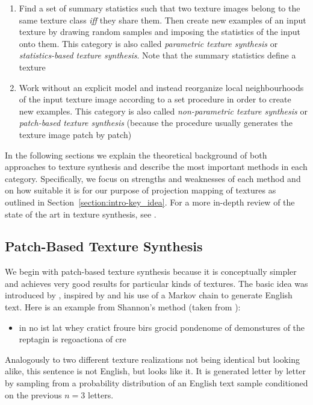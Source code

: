 \begin{enumerate}
    \item Find a set of summary statistics such that two texture images belong to the same texture class \textit{iff} they share them. Then create new examples of an input texture by drawing random samples and imposing the statistics of the input onto them. This category is also called \textit{parametric texture synthesis} or \textit{statistics-based texture synthesis}. Note that the summary statistics define a texture
    \item Work without an explicit model and instead reorganize local neighbourhoods of the input texture image according to a set procedure in order to create new examples. This category is also called \textit{non-parametric texture synthesis} or \textit{patch-based texture synthesis} (because the procedure usually generates the texture image patch by patch)
\end{enumerate}

In the following sections we explain the theoretical background of both approaches to texture synthesis and describe the most important methods in each category. Specifically, we focus on strengths and weaknesses of each method and on how suitable it is for our purpose of projection mapping of textures as outlined in Section~\ref{section:intro-key_idea}. For a more in-depth review of the state of the art in texture synthesis, see \citet{Raad2018}.

\subsection{Patch-Based Texture Synthesis}
\label{section:background-texture_synthesis-patch_based}

We begin with patch-based texture synthesis because it is conceptually simpler and achieves very good results for particular kinds of textures. The basic idea was introduced by \citet{Efros1999}, inspired by \citet{Shannon1948} and his use of a Markov chain to generate English text. Here is an example from Shannon's method (taken from \citet{Raad2018}):

\begin{itemize}
    \item in no ist lat whey cratict froure birs grocid pondenome of demonstures of the reptagin is regoactiona of cre
\end{itemize}

Analogously to two different texture realizations not being identical but looking alike, this sentence is not English, but looks like it. It is generated letter by letter by sampling from a probability distribution of an English text sample conditioned on the previous \(n = 3\) letters.

